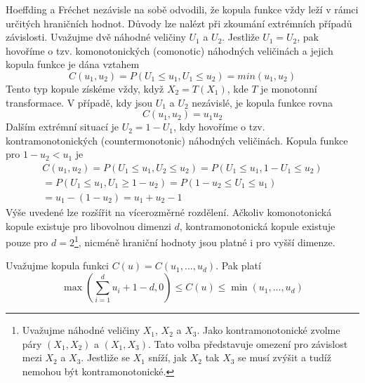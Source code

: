 Hoeffding a Fréchet nezávisle na sobě odvodili, že kopula funkce vždy leží v rámci určitých hraničních hodnot. Důvody lze nalézt při zkoumání extrémních případů závislosti.
Uvažujme dvě náhodné veličiny $U_1$ a $U_2$. Jestliže $U_1 = U_2$, pak hovoříme o tzv. komonotonických (comonotic) náhodných veličinách a jejich kopula funkce je dána vztahem
\begin{equation}
C(u_1, u_2) = P(U_1 \le u_1, U_1 \le u_2) = min(u_1, u_2)
\end{equation}
Tento typ kopule získéme vždy, když $X_2 = T(X_1)$, kde $T$ je monotonní transformace.
V případě, kdy jsou $U_1$ a $U_2$ nezávislé, je kopula funkce rovna
\begin{equation}
C(u_1, u_2) = u_1 u_2
\end{equation}
Dalším extrémní situací je $U_2 = 1 - U_1$, kdy hovoříme o tzv. kontramonotonických (countermonotonic) náhodných veličinách. Kopula funkce pro $1 - u_2 < u_1$ je
\begin{multline}
C(u_1, u_2) = P(U_1 \le u_1, U_2 \le u_2) = P(U_1 \le u_1, 1 - U_1 \le u_2)\\
= P(U_1 \le u_1, U_1 \ge 1 - u_2) = P(1 - u_2 \le U_1 \le u_1)\\
= u_1 - (1 - u_2) = u_1 + u_2 - 1
\end{multline}
Výše uvedené lze rozšířit na vícerozměrné rozdělení. Ačkoliv komonotonická kopule existuje pro libovolnou dimenzi $d$, kontramonotonická kopule existuje pouze pro $d = 2$\footnote{Uvažujme náhodné veličiny $X_1$, $X_2$ a $X_3$. Jako kontramonotonické zvolme páry $(X_1, X_2)$ a $(X_1, X_3)$. Tato volba představuje omezení pro závislost mezi $X_2$ a $X_3$. Jestliže se $X_1$ sníží, jak $X_2$ tak $X_3$ se musí zvýšit a tudíž nemohou být kontramonotonické.}, nicméně hraniční hodnoty jsou platné i pro vyšší dimenze.

\begin{theorem}
Uvažujme kopula funkci $C(u) = C(u_1, ..., u_d)$. Pak platí
\begin{equation*}
\max\left(\sum_{i = 1}^d u_i + 1 - d, 0 \right) \le C(u) \le \min\left(u_1, ..., u_d\right)
\end{equation*}
\end{theorem}


